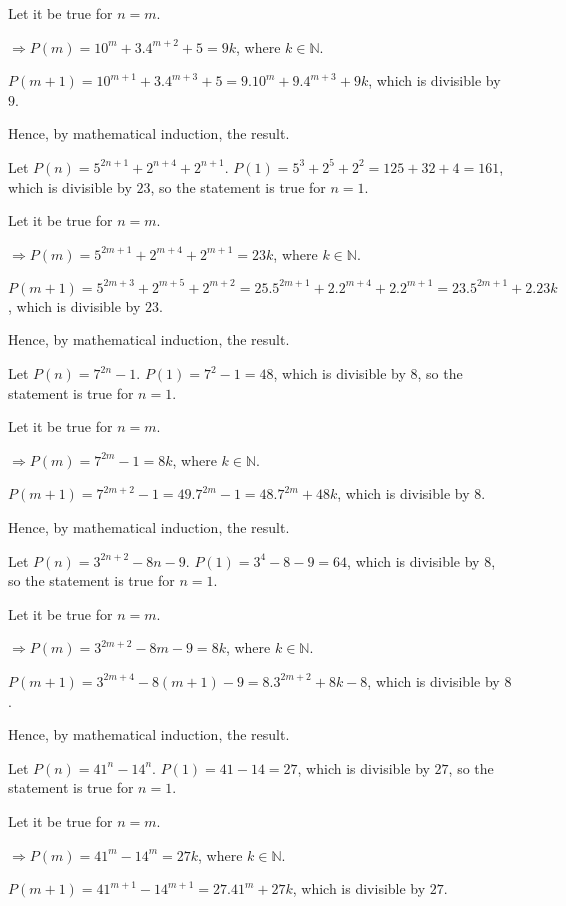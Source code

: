   Let it be true for $n = m$.

  $\Rightarrow P(m) = 10^m + 3.4^{m + 2} + 5 = 9k$, where $k\in\mathbb{N}$.

  $P(m + 1) = 10^{m + 1} + 3.4^{m + 3} + 5 = 9.10^m + 9.4^{m + 3} + 9k$, which is divisible by $9$.

  Hence, by mathematical induction, the result.
\item Let $P(n) = 5^{2n + 1} + 2^{n + 4} + 2^{n + 1}$. $P(1) = 5^3 + 2^5 + 2^2 = 125 + 32 + 4 = 161$, which
  is divisible by $23$, so the statement is true for $n = 1$.

  Let it be true for $n = m$.

  $\Rightarrow P(m) = 5^{2m + 1} + 2^{m + 4} + 2^{m + 1} = 23k$, where $k\in\mathbb{N}$.

  $P(m + 1) = 5^{2m + 3} + 2^{m + 5} + 2^{m + 2} = 25.5^{2m + 1} + 2.2^{m + 4} + 2.2^{m + 1} = 23.5^{2m + 1}
  + 2.23k$, which is divisible by $23$.

  Hence, by mathematical induction, the result.
\item Let $P(n) = 7^{2n} - 1$. $P(1) = 7^2 - 1 = 48$, which is divisible by $8$, so the statement is true
  for $n = 1$.

  Let it be true for $n = m$.

  $\Rightarrow P(m) = 7^{2m} - 1 = 8k$, where $k\in\mathbb{N}$.

  $P(m + 1) = 7^{2m + 2} - 1 = 49.7^{2m} - 1 = 48.7^{2m} + 48k$, which is divisible by $8$.

  Hence, by mathematical induction, the result.
\item Let $P(n) = 3^{2n + 2} - 8n - 9$. $P(1) = 3^4 - 8 - 9 = 64$, which is divisible by $8$, so the
  statement is true for $n = 1$.

  Let it be true for $n = m$.

  $\Rightarrow P(m) = 3^{2m + 2} - 8m - 9 = 8k$, where $k\in\mathbb{N}$.

  $P(m + 1) = 3^{2m + 4} - 8(m + 1) - 9 = 8.3^{2m + 2} + 8k - 8$, which is divisible by $8$.

  Hence, by mathematical induction, the result.
\item Let $P(n) = 41^n - 14^n$. $P(1) = 41 - 14 = 27$, which is divisible by $27$, so the statement is true
  for $n = 1$.

  Let it be true for $n = m$.

  $\Rightarrow P(m) = 41^m - 14^m = 27k$, where $k\in\mathbb{N}$.

  $P(m + 1) = 41^{m + 1} - 14^{m + 1} = 27.41^m + 27k$, which is divisible by $27$.

